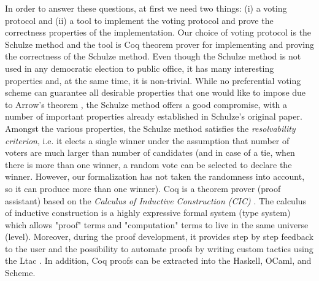 In order to answer these questions, at first we need two things: (i) a voting protocol and 
(ii) a tool to implement the voting protocol and prove the correctness properties of the implementation. 
Our choice of voting protocol is the   Schulze method \citep{Schulze:2011:NMC} and 
the tool is Coq \citep{Bertot:2004:ITP} theorem prover  for implementing and proving 
the correctness of  the Schulze method.
Even though the Schulze method is not used in any democratic election to public office,
it has many interesting properties and, 
 at the same time, it is non-trivial.  
While no preferential voting scheme can guarantee all desirable properties that one would
like to impose due to Arrow’s theorem \citep{Arrow:1950:DCS}, the Schulze method offers a good compromise, 
with a number of important properties already  established  in  Schulze’s  original  paper. 
Amongst the various  properties, the Schulze method satisfies the \textit{resolvability criterion}, 
i.e. it elects a single winner under the assumption that number of voters are much larger than
 number of candidates (and in case of a tie, when there is more than one winner, a random vote can be 
selected to declare the winner.  However, our formalization 
has not taken the randomness into account, so it can produce more than one winner). 
Coq is a theorem prover (proof assistant) based on the \textit{Calculus of Inductive Construction (CIC)} 
\citep{Coquand:1988:CC:47724.47725} \citep{coquand1988inductively}. 
The calculus of inductive construction is a highly expressive formal system (type system) 
which allows "proof" terms and 
"computation" terms to live in the same universe (level). Moreover, during the proof development, 
it provides step by step feedback to the user and the possibility to automate proofs by 
writing custom tactics using the Ltac \citep{10.5555/1765236.1765246}. In addition, 
Coq proofs can be extracted into the  Haskell, OCaml, and Scheme.
 
